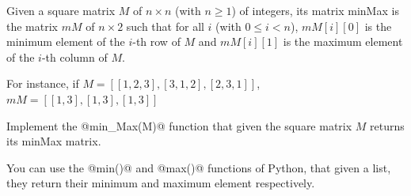 
\UsePython

\Statement

Given a square matrix $M$ of $n\times n$ (with $n\geq 1$) of integers,
its matrix minMax is the matrix $mM$ of $n\times 2$ such that for all $i$ (with $0\leq i<n$),
$mM[i][0]$ is the minimum element of the $i$-th row of $M$ and $mM[i][1]$ is
the maximum element of the $i$-th column of $M$.

\medskip

For instance, if $M = [[1,2,3], [3,1,2], [2,3,1]]$, $mM = [[1,3], [1,3], [1,3]]$

\medskip

Implement the @min_Max(M)@ function that given the square matrix $M$
returns its minMax matrix.

\medskip

You can use the @min()@ and @max()@ functions of Python,
that given a list, they return their minimum and maximum element respectively.

\SampleSession
